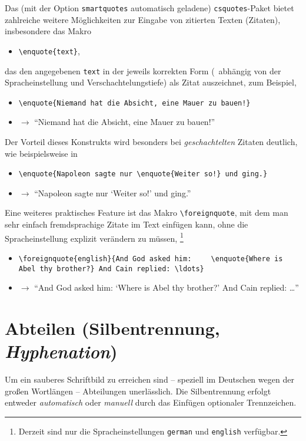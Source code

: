 Das (mit der Option \texttt{smartquotes} automatisch geladene)
\texttt{csquotes}-Paket bietet zahlreiche weitere Möglichkeiten zur Eingabe
von zitierten Texten (Zitaten), insbesondere das Makro
%
\begin{itemize}
    \item[] \verb!\enquote{text}!,
\end{itemize}
%
das den angegebenen \texttt{text} in der jeweils korrekten Form (\ua\
abhängig von der Sprach\-einstellung und Verschachtelungstiefe) als Zitat
auszeichnet, zum Beispiel,
%
\begin{itemize}
    \item[] \verb|\enquote{Niemand hat die Absicht, eine Mauer zu bauen!}|
    \item[] $\rightarrow$ \enquote{Niemand hat die Absicht, eine Mauer zu
    bauen!}
\end{itemize}
%
Der Vorteil dieses Konstrukts wird besonders bei \emph{geschachtelten}
Zitaten deutlich, wie beispielsweise in
%
\begin{itemize}
    \item[] \verb|\enquote{Napoleon sagte nur \enquote{Weiter so!} und ging.}|
    \item[] $\rightarrow$ \enquote{Napoleon sagte nur \enquote{Weiter so!}
    und ging.}
\end{itemize}
%
Eine weiteres praktisches Feature ist das Makro \verb!\foreignquote!, mit dem
man sehr einfach fremdsprachige Zitate im Text einfügen kann, ohne die
Spracheinstellung explizit verändern zu müssen, \zB%
\footnote{Derzeit sind nur die Spracheinstellungen \texttt{german} und
\texttt{english} verfügbar.}
%
\begin{itemize}
    \item[] \verb|\foreignquote{english}{And God asked him: |\newline
    \verb|   \enquote{Where is Abel thy brother?} And Cain replied: \ldots}|
    \item[] $\rightarrow$ \foreignquote{english}{And God asked him:
    \enquote{Where is Abel thy brother?} And Cain replied: \ldots}
\end{itemize}


\section{Abteilen (Silbentrennung, \emph{Hyphenation})}
\label{subsec:layout-abteilen}

Um ein sauberes Schriftbild zu erreichen sind -- speziell im Deutschen wegen
der großen Wortlängen -- Abteilungen unerlässlich. Die Silbentrennung erfolgt
entweder \emph{automatisch} oder \emph{manuell} durch das Einfügen optionaler
Trennzeichen.

